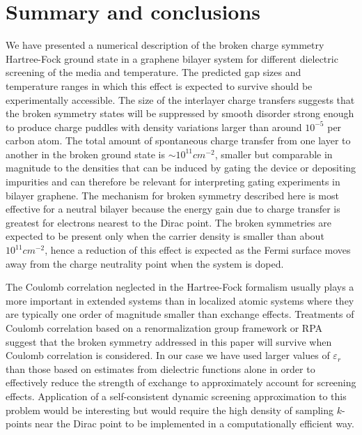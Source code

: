 \documentclass[twocolumn,prb,showpacs,preprintnumbers,amsmath,amssymb]{revtex4}
\begin{document}
\section{Summary and conclusions}
We have presented a numerical description of the broken charge symmetry 
Hartree-Fock ground state in a graphene bilayer system for different dielectric
screening of the media and temperature. 
The predicted gap sizes and temperature ranges in which this effect is expected to survive
should be experimentally accessible.  The size of the interlayer 
charge transfers suggests that the broken symmetry states will be suppressed
by smooth disorder strong enough to produce charge puddles with density variations
larger than around $10^{-5}$ per carbon atom.
The total amount of spontaneous charge transfer from one layer to another in the broken 
ground state is $\sim  10^{11} cm^{-2}$, 
smaller but comparable in magnitude to the densities that can be induced by 
gating the device or depositing impurities 
\cite{geim} and can therefore be relevant for interpreting gating experiments in bilayer graphene. 
The mechanism for broken symmetry described here is 
most effective for a neutral bilayer because 
the energy gain due to charge transfer is greatest for electrons nearest to the
Dirac point. 
The broken symmetries are expected to be present only when the carrier density is smaller than about $10^{11} cm^{-2}$,
hence a reduction of this  
effect is expected as the Fermi surface moves away
from the charge neutrality point when the system is doped.


The Coulomb correlation neglected in the
Hartree-Fock formalism usually plays a more important in extended systems
\cite{2dmontecarlo} than in localized atomic systems
where they are typically one order of magnitude smaller than exchange effects.
Treatments of Coulomb correlation based on a renormalization group framework \cite{fanzhang} 
or RPA \cite{nandkishore1} suggest that the broken symmetry addressed in this paper 
will survive when Coulomb correlation is considered. 
In our case we have used larger values of $\varepsilon_r$ 
than those based on estimates from dielectric functions alone 
in order to effectively reduce the strength of exchange  
to approximately account for screening effects.
Application of a self-consistent dynamic screening approximation to this 
problem would be interesting but would require the 
high density of sampling $k$-points near the Dirac point to be 
implemented in a computationally efficient way.
\end{document}
